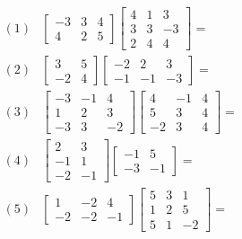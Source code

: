 \documentclass{standalone}
\begin{document}
$\begin{array}{ll}
(1) &\left[\begin{matrix}-3 & 3 & 4\\4 & 2 & 5\end{matrix}\right]\left[\begin{matrix}4 & 1 & 3\\3 & 3 & -3\\2 & 4 & 4\end{matrix}\right] =\\[0.5cm]
(2) &\left[\begin{matrix}3 & 5\\-2 & 4\end{matrix}\right]\left[\begin{matrix}-2 & 2 & 3\\-1 & -1 & -3\end{matrix}\right] =\\[0.5cm]
(3) &\left[\begin{matrix}-3 & -1 & 4\\1 & 2 & 3\\-3 & 3 & -2\end{matrix}\right]\left[\begin{matrix}4 & -1 & 4\\5 & 3 & 4\\-2 & 3 & 4\end{matrix}\right] =\\[0.5cm]
(4) &\left[\begin{matrix}2 & 3\\-1 & 1\\-2 & -1\end{matrix}\right]\left[\begin{matrix}-1 & 5\\-3 & -1\end{matrix}\right] =\\[0.5cm]
(5) &\left[\begin{matrix}1 & -2 & 4\\-2 & -2 & -1\end{matrix}\right]\left[\begin{matrix}5 & 3 & 1\\1 & 2 & 5\\5 & 1 & -2\end{matrix}\right] =\\
\end{array}
$
\end{document}

